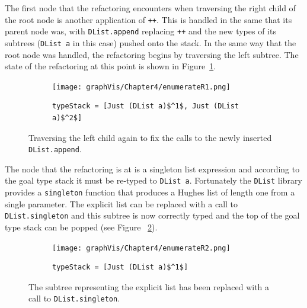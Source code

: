 The first node that the refactoring encounters when traversing the right child of the root node is another application of \texttt{++}. This is handled in the same that its parent node was, with \texttt{DList.append} replacing \texttt{++} and the new types of its subtrees (\texttt{DList a} in this case) pushed onto the stack. In the same way that the root node was handled, the refactoring begins by traversing the left subtree. The state of the refactoring at this point is shown in Figure~\ref{enumStateR1}.

\begin{figure}[t]
	\begin{subfigure}{\linewidth}
		\texttt{[image: graphVis/Chapter4/enumerateR1.png]}
	\end{subfigure}\par\medskip

	\begin{subfigure}{\linewidth}
		\begin{lstlisting}[mathescape]
			typeStack = [Just (DList a)$^1$, Just (DList a)$^2$]
		\end{lstlisting}
	\end{subfigure}\par\medskip
\caption{Traversing the left child again to fix the calls to the newly inserted \texttt{DList.append}.}
\label{enumStateR1}
\end{figure}

The node that the refactoring is at is a singleton list expression and according to the goal type stack it must be re-typed to \texttt{DList a}. Fortunately the \texttt{DList} library provides a \texttt{singleton} function that produces a Hughes list of length one from a single parameter. The explicit list can be replaced with a call to \texttt{DList.singleton} and this subtree is now correctly typed and the top of the goal type stack can be popped (see Figure ~\ref{enumStateR2}).

\begin{figure}[t]
	\begin{subfigure}{\linewidth}
		\texttt{[image: graphVis/Chapter4/enumerateR2.png]}
	\end{subfigure}\par\medskip

	\begin{subfigure}{\linewidth}
		\begin{lstlisting}[mathescape]
			typeStack = [Just (DList a)$^1$]
		\end{lstlisting}
	\end{subfigure}\par\medskip
\caption{The subtree representing the explicit list has been replaced with a call to \texttt{DList.singleton}.}
\label{enumStateR2}
\end{figure}

